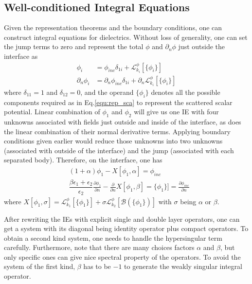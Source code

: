 \documentclass[conference]{IEEEtran}
\begin{document}
\subsection{Well-conditioned Integral Equations}
Given the representation theorems and the boundary conditions, one can construct integral equations for dielectrics. Without loss of generality, one
can set the jump terms to zero and represent the total $\phi$ and $\partial_n \phi$ just outside the interface as
\begin{subequations}
\begin{align}
\phi_{i} &= \phi_{inc}\delta_{1i} + \mathcal{L}^{\phi}_{k_i}[\{\phi_{i}\}]   \\
\partial_n \phi_{i}
&= \partial_n \phi_{inc} \delta_{1i}
+ \partial_n\mathcal{L}^{\phi}_{k_i}[\{\phi_{i}\}]
\end{align}
\end{subequations}
where $\delta_{11}=1$ and $\delta_{12}=0$, and the operand $\{ \phi_{i} \}$ denotes all the possible components required as in Eq.\ref{equ:rep_sca} to represent the scattered scalar potential. Linear combination of $\phi_1$ and $\phi_2$ will give us one IE with four unknowns associated with fields just outside and inside of the interface, as does the linear combination of their normal derivative terms. Applying boundary conditions given earlier would reduce those unknowns into two unknowns (associated with outside of the interface) and the jump (associated with each separated body). Therefore, on the interface, one has
\begin{subequations}
\begin{align}
& (1+\alpha )\phi_{1} - X[\phi_1, \alpha]  = \phi_{inc} \\
& \dfrac{\beta\epsilon_1 + \epsilon_2}{\epsilon_2}\frac{\partial \phi_{1}}{\partial n} 
- \frac{\partial}{\partial n} X[\phi_1, \beta]=\{ \phi_{1} \}] = \frac{\partial \phi_{inc} }{\partial n}
\end{align}
\end{subequations}
where $X[\phi_1, \sigma]=  \mathcal{L}^{\phi}_{k_1} [\{ \phi_{1} \}] +\sigma \mathcal{L}^{\phi}_{k_2}[\mathcal{B}(\{ \phi_{1}\})]$ with $\sigma$ being $\alpha$ or $\beta$.

After rewriting the IEs with explicit single and double layer operators, one can get a system with its diagonal being identity operator plus compact operators. To obtain a second kind system, one needs to handle the hypersingular term carefully. Furthermore, note that there are many choices factors $\alpha$ and $\beta$, but only specific ones can give nice spectral property of the operators. To avoid the system of the first kind, $\beta$ has to be $-1$ to generate the weakly singular integral operator.
\end{document}
